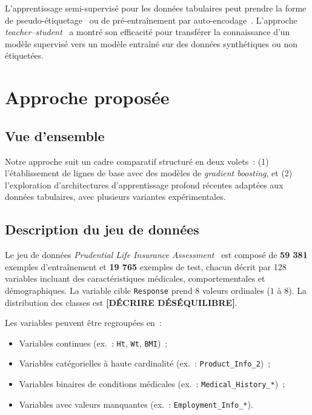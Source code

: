 \documentclass[conference]{IEEEtran}
\begin{document}
L'apprentissage semi-supervisé pour les données tabulaires peut prendre la forme de
pseudo-étiquetage~\cite{lee2013pseudo} ou de pré-entraînement par auto-encodage~\cite{TODO}.
L'approche \textit{teacher--student}~\cite{hinton2015distilling} a montré son efficacité pour
transférer la connaissance d'un modèle supervisé vers un modèle entraîné sur des données
synthétiques ou non étiquetées.

\section{Approche proposée}
\label{sec:approche}

\subsection{Vue d'ensemble}

Notre approche suit un cadre comparatif structuré en deux volets~: (1) l'établissement de
lignes de base avec des modèles de \textit{gradient boosting}, et (2) l'exploration
d'architectures d'apprentissage profond récentes adaptées aux données tabulaires, avec
plusieurs variantes expérimentales.

\subsection{Description du jeu de données}

Le jeu de données \textit{Prudential Life Insurance Assessment}~\cite{kaggle_prudential} est composé de \textbf{59 381} exemples d'entraînement et \textbf{19 765} exemples de test, chacun décrit par 128 variables incluant des caractéristiques médicales, comportementales et démographiques. La variable cible \texttt{Response} prend 8 valeurs ordinales ($1$ à $8$).
La distribution des classes est \textbf{[DÉCRIRE DÉSÉQUILIBRE]}.

Les variables peuvent être regroupées en~:
\begin{itemize}
  \item Variables continues (ex.~: \texttt{Ht}, \texttt{Wt}, \texttt{BMI})~;
  \item Variables catégorielles à haute cardinalité (ex.~: \texttt{Product\_Info\_2})~;
  \item Variables binaires de conditions médicales (ex.~: \texttt{Medical\_History\_*})~;
  \item Variables avec valeurs manquantes (ex.~: \texttt{Employment\_Info\_*}).
\end{itemize}
\end{document}
